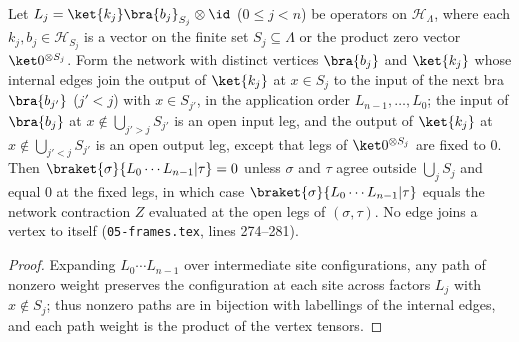 \begin{lemma}
    \label{lem:peps_frame_chain_network}
    \leanok
    Let $L_j=\ket{k_j}\bra{b_j}_{S_j}\otimes\id$ ($0\le j<n$) be operators on $\mathcal H_\Lambda$, where each
    $k_j,b_j\in\mathcal H_{S_j}$ is a vector on the finite set $S_j\subseteq\Lambda$
    or the product zero vector $\ket0^{\otimes S_j}$. Form the network with distinct vertices
    $\bra{b_j}$ and $\ket{k_j}$ whose internal
    edges join the output of $\ket{k_j}$ at $x\in S_j$ to the input of the next bra
    $\bra{b_{j'}}$ ($j'<j$) with $x\in S_{j'}$, in the application order $L_{n-1},\dots,L_0$;
    the input of $\bra{b_j}$ at $x\notin\bigcup_{j'>j}S_{j'}$ is an open
    input leg, and the output of $\ket{k_j}$ at $x\notin\bigcup_{j'<j}S_{j'}$
    is an open output leg, except that legs of $\ket0^{\otimes S_j}$ are
    fixed to $0$. Then $\braket{\sigma}{L_0\cdots L_{n-1}|\tau}=0$ unless
    $\sigma$ and $\tau$ agree outside $\bigcup_j S_j$ and equal
    $0$ at the fixed legs, in which case $\braket{\sigma}{L_0\cdots L_{n-1}|\tau}$ equals the network contraction $Z$
    evaluated at the open legs of $(\sigma,\tau)$. No edge
    joins a vertex to itself (\texttt{05-frames.tex}, lines 274--281).
\end{lemma}

\begin{proof}\leanok
    Expanding $L_0\cdots L_{n-1}$ over intermediate site configurations,
    any path of nonzero weight preserves the configuration at each site across factors $L_j$ with $x\notin S_j$; thus nonzero paths are in bijection with labellings of the internal edges, and each path weight is the product of the vertex tensors.
\end{proof}

